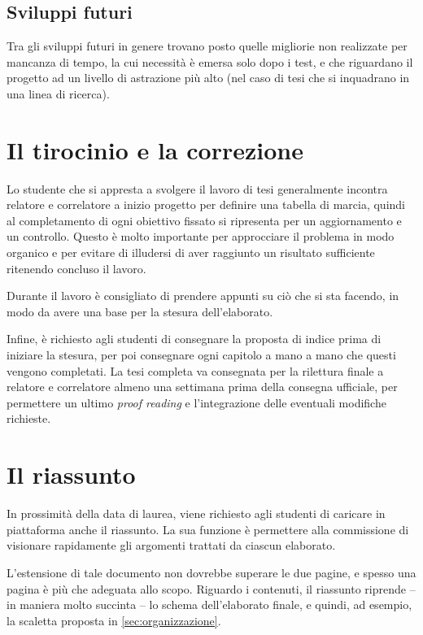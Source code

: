 \documentclass[12pt]{report}
\begin{document}
\section{Sviluppi futuri}

Tra gli sviluppi futuri in genere trovano posto quelle migliorie non realizzate per mancanza di tempo, la cui necessità è emersa solo dopo i test, e che riguardano il progetto ad un livello di astrazione più alto (nel caso di tesi che si inquadrano in una linea di ricerca).


% 
% 

\appendix

\chapter{Il tirocinio e la correzione}

Lo studente che si appresta a svolgere il lavoro di tesi generalmente incontra relatore e correlatore a inizio progetto per definire una tabella di marcia, quindi al completamento di ogni obiettivo fissato si ripresenta per un aggiornamento e un controllo. Questo è molto importante per approcciare il problema in modo organico e per evitare di illudersi di aver raggiunto un risultato sufficiente ritenendo concluso il lavoro.

Durante il lavoro è consigliato di prendere appunti su ciò che si sta facendo, in modo da avere una base per la stesura dell'elaborato.

Infine, è richiesto agli studenti di consegnare la proposta di indice prima di iniziare la stesura, per poi consegnare ogni capitolo a mano a mano che questi vengono completati. La tesi completa va consegnata per la rilettura finale a relatore e correlatore almeno una settimana prima della consegna ufficiale, per permettere un ultimo \textit{proof reading} e l'integrazione delle eventuali modifiche richieste.

\chapter{Il riassunto}

In prossimità della data di laurea, viene richiesto agli studenti di caricare in piattaforma anche il riassunto. La sua funzione è permettere alla commissione di visionare rapidamente gli argomenti trattati da ciascun elaborato.

L'estensione di tale documento non dovrebbe superare le due pagine, e spesso una pagina è più che adeguata allo scopo. Riguardo i contenuti, il riassunto riprende -- in maniera molto succinta -- lo schema dell'elaborato finale, e quindi, ad esempio, la scaletta proposta in \ref{sec:organizzazione}.
\end{document}
